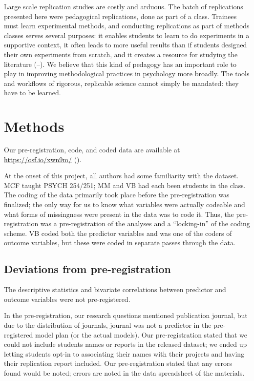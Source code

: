 \documentclass[
  english,
  a4paper,
]{article}
\begin{document}
Large scale replication studies are costly and arduous. The batch of replications presented here were pedagogical replications, done as part of a class. Trainees must learn experimental methods, and conducting replications as part of methods classes serves several purposes: it enables students to learn to do experiments in a supportive context, it often leads to more useful results than if students designed their own experiments from scratch, and it creates a resource for studying the literature (--). We believe that this kind of pedagogy has an important role to play in improving methodological practices in psychology more broadly. The tools and workflows of rigorous, replicable science cannot simply be mandated: they have to be learned.

\section{Methods}\label{methods}

Our pre-registration, code, and coded data are available at \url{https://osf.io/xwn9m/} ().

At the onset of this project, all authors had some familiarity with the dataset. MCF taught PSYCH 254/251; MM and VB had each been students in the class. The coding of the data primarily took place before the pre-registration was finalized; the only way for us to know what variables were actually codeable and what forms of missingness were present in the data was to code it. Thus, the pre-registration was a pre-registration of the analyses and a ``locking-in'' of the coding scheme. VB coded both the predictor variables and was one of the coders of outcome variables, but these were coded in separate passes through the data.

\subsection{Deviations from pre-registration}\label{deviations-from-pre-registration}

The descriptive statistics and bivariate correlations between predictor and outcome variables were not pre-registered.

In the pre-registration, our research questions mentioned publication journal, but due to the distribution of journals, journal was not a predictor in the pre-registered model plan (or the actual models). Our pre-registration stated that we could not include students names or reports in the released dataset; we ended up letting students opt-in to associating their names with their projects and having their replication report included. Our pre-registration stated that any errors found would be noted; errors are noted in the data spreadsheet of the materials.
\end{document}
